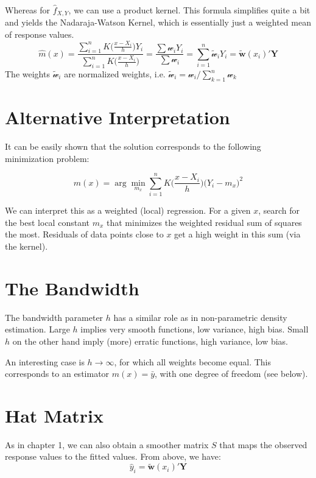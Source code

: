 \documentclass[]{book}
\begin{document}
Whereas for \(\hat{f}_{X, Y}\), we can use a product kernel. This
formula simplifies quite a bit and yields the Nadaraja-Watson Kernel,
which is essentially just a weighted mean of response values.
\[\hat{m}(x) = \frac{\sum\limits_{i = 1}^n K\Big(\frac{x-X_i}{h}\Big)Y_i}{\sum\limits_{i = 1}^nK\Big(\frac{x-X_i}{h}\Big)} = \frac{\sum\mathcal{w}_i Y_i}{\sum\mathcal{w}_i} = \sum\limits_{i = 1}^n \tilde{\mathcal{w}}_i Y_i = \tilde{\mathbf{w}}(x_i)'\mathbf{Y}\]
The weights \(\tilde{\mathcal{w}}_i\) are normalized weights, i.e.
\(\tilde{\mathcal{w}}_i = \mathcal{w}_i / \sum\limits_{k = 1}^n \mathcal{w}_k\)

\section{Alternative Interpretation}\label{alternative-interpretation}

It can be easily shown that the solution corresponds to the following
minimization problem:

\[ m(x) = \arg\min\limits_{m_x} \sum\limits_{i = 1}^nK\Big(\frac{x-X_i}{h}\Big)\big(Y_i-m_x\big)^2 \]

We can interpret this as a weighted (local) regression. For a given
\(x\), search for the best local constant \(m_x\) that minimizes the
weighted residual sum of squares the most. Residuals of data points
close to \(x\) get a high weight in this sum (via the kernel).

\section{The Bandwidth}\label{the-bandwidth}

The bandwidth parameter \(h\) has a similar role as in non-parametric
density estimation. Large \(h\) implies very smooth functions, low
variance, high bias. Small \(h\) on the other hand imply (more) erratic
functions, high variance, low bias.

An interesting case is \(h \rightarrow \infty\), for which all weights
become equal. This corresponds to an estimator \(m(x) = \bar{y}\), with
one degree of freedom (see below).

\section{Hat Matrix}\label{hat-matrix}

As in chapter 1, we can also obtain a smoother matrix \(S\) that maps
the observed response values to the fitted values. From above, we have:
\[\hat{y}_i = \tilde{\mathbf{w}}(x_i)'\mathbf{Y}\]
\end{document}
